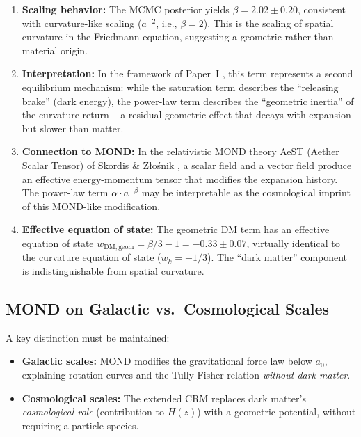 \documentclass[aps,prd,twocolumn,superscriptaddress,nofootinbib]{revtex4-2}
\begin{document}
\begin{enumerate}
\item \textbf{Scaling behavior:} The MCMC posterior yields $\beta = 2.02 \pm 0.20$, consistent with curvature-like scaling ($a^{-2}$, i.e., $\beta = 2$). This is the scaling of spatial curvature in the Friedmann equation, suggesting a geometric rather than material origin.

\item \textbf{Interpretation:} In the framework of Paper~I \cite{Geiger2026}, this term represents a second equilibrium mechanism: while the saturation term describes the ``releasing brake'' (dark energy), the power-law term describes the ``geometric inertia'' of the curvature return -- a residual geometric effect that decays with expansion but slower than matter.

\item \textbf{Connection to MOND:} In the relativistic MOND theory AeST (Aether Scalar Tensor) of Skordis \& Z{\l}o\'snik \cite{Skordis2021}, a scalar field and a vector field produce an effective energy-momentum tensor that modifies the expansion history. The power-law term $\alpha \cdot a^{-\beta}$ may be interpretable as the cosmological imprint of this MOND-like modification.

\item \textbf{Effective equation of state:} The geometric DM term has an effective equation of state $w_{\mathrm{DM,geom}} = \beta/3 - 1 = -0.33 \pm 0.07$, virtually identical to the curvature equation of state ($w_k = -1/3$). The ``dark matter'' component is indistinguishable from spatial curvature.
\end{enumerate}

\subsection{MOND on Galactic vs.\ Cosmological Scales}

A key distinction must be maintained:
\begin{itemize}
\item \textbf{Galactic scales:} MOND modifies the gravitational force law below $a_0$, explaining rotation curves and the Tully-Fisher relation \textit{without dark matter}.
\item \textbf{Cosmological scales:} The extended CRM replaces dark matter's \textit{cosmological role} (contribution to $H(z)$) with a geometric potential, without requiring a particle species.
\end{itemize}
\end{document}
